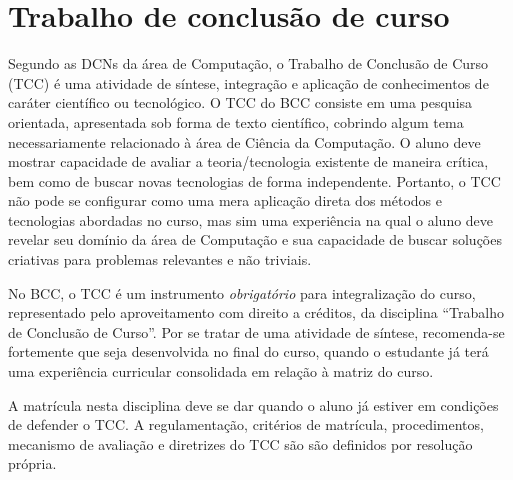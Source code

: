 \section{Trabalho de conclusão de curso}
\label{sec:trabalho_conclusao_curso}

Segundo as DCNs da área de Computação, o Trabalho de Conclusão de Curso (TCC) é
uma atividade de síntese, integração e aplicação de conhecimentos de caráter
científico ou tecnológico. 
O TCC do BCC consiste em uma pesquisa orientada, apresentada sob forma de texto
científico, cobrindo algum tema necessariamente relacionado à área de Ciência
da Computação. 
O aluno deve mostrar capacidade de avaliar a teoria/tecnologia existente de
maneira crítica, bem como de buscar novas tecnologias de forma independente.
Portanto, o TCC não pode se configurar como uma mera aplicação direta dos
métodos e tecnologias abordadas no curso, mas sim uma experiência na qual o
aluno deve revelar seu domínio da área de Computação e sua capacidade de buscar
soluções criativas para problemas relevantes e não triviais.


No BCC, o TCC é um instrumento \textit{obrigatório} para
integralização do curso, representado pelo aproveitamento com direito
a créditos, da disciplina ``Trabalho de Conclusão de Curso''. Por se
tratar de uma atividade de síntese, recomenda-se fortemente que seja
desenvolvida no final do curso, quando o estudante já terá uma
experiência curricular consolidada em relação à matriz do curso.

A matrícula nesta disciplina deve se dar quando o aluno já estiver em
condições de defender o TCC. A regulamentação, critérios de matrícula,
procedimentos, mecanismo de avaliação e diretrizes do TCC são são
definidos por resolução própria.
